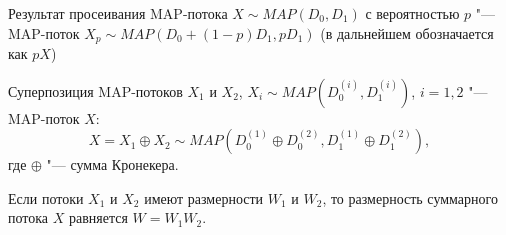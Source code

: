 \begin{thm}\label{th:ch4_sifted_map}\textnormal{\cite{VishnevskyDudin2018}}
  Результат просеивания MAP-потока $X \sim MAP(D_{0},D_{1})$ с вероятностью $p$ "--- MAP-поток $X_{p} \sim MAP(D_{0}+(1-p)D_{1},pD_{1})$ (в дальнейшем обозначается как $pX$)
\end{thm}

\begin{thm}\label{th:ch4_maps_sum}\textnormal{\cite{VishnevskyDudin2018}}
  Суперпозиция MAP-потоков $X_{1}$ и $X_{2}$, $X_i \sim MAP(D_{0}^{(i)},D_{1}^{(i)})$, $i=1,2$ "--- MAP-поток $X$:
  $$
    X = X_{1} \oplus X_{2} \sim MAP(D_{0}^{(1)} \oplus D_{0}^{(2)},D_{1}^{(1)} \oplus D_{1}^{(2)}),
  $$
  где $\oplus$ "--- сумма Кронекера.
\end{thm}

\begin{rem}
  Если потоки $X_1$ и $X_2$ имеют размерности $W_1$ и $W_2$, то размерность суммарного потока $X$ равняется $W = W_1 W_2$.
\end{rem}

